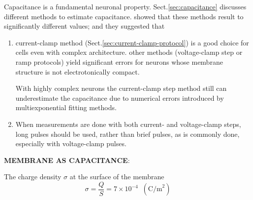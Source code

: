 Capacitance is a fundamental neuronal property. 
Sect.\ref{sec:capacitance} discusses  different methods to estimate capacitance.
\citep{golowasch2009} showed that these methods result to significantly
different values; and they suggested that
\begin{enumerate}
  
  \item  current-clamp method (Sect.\ref{sec:current-clamp-protocol}) is a good
  choice for cells even with complex architecture. other methods (voltage-clamp
  step or ramp protocols) yield significant errors for neurons whose membrane
  structure is not electrotonically compact.

With highly complex neurons the current-clamp step method still can
underestimate the capacitance due to numerical errors introduced by
multiexponential fitting methods.

   \item When measurements are done with both current- and voltage-clamp steps,
   long pulses should be used, rather than brief pulses, as is commonly done,
   especially with voltage-clamp pulses.
\end{enumerate}



{\bf MEMBRANE AS CAPACITANCE}: 


The charge density $\sigma$ at the surface of the membrane
\begin{equation}
\sigma	= \frac{Q}{S} = 7\times 10^{-4} \;\;(\text{C/m}^2)
\end{equation}

